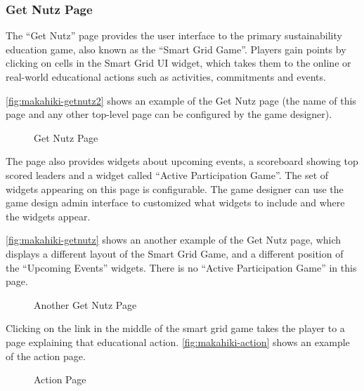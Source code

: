 \subsubsection{Get Nutz Page}
The ``Get Nutz'' page provides the user interface to the primary sustainability education game, also known as the ``Smart Grid Game''. Players gain points by clicking on cells in the Smart Grid UI widget, which takes them to the online or real-world educational actions such as activities, commitments and events.

\autoref{fig:makahiki-getnutz2} shows an example of the Get Nutz page (the name of this page and any other top-level page can be configured by the game designer).

\begin{figure}[!ht]
\begin{center}
\end{center}
\caption{Get Nutz Page}
\label{fig:makahiki-getnutz2}
\end{figure}

The page also provides widgets about upcoming events, a scoreboard showing top scored leaders and a widget called ``Active Participation Game''. The set of widgets appearing on this page is configurable. The game designer can use the game design admin interface to customized what widgets to include and where the widgets appear. 

\clearpage

\autoref{fig:makahiki-getnutz} shows an another example of the Get Nutz page, which displays a different layout of the Smart Grid Game, and a different position of the ``Upcoming Events'' widgets. There is no ``Active Participation Game'' in this page.

\begin{figure}[!ht]
\begin{center}
\end{center}
\caption{Another Get Nutz Page}
\label{fig:makahiki-getnutz}
\end{figure}

\clearpage

Clicking on the link in the middle of the smart grid game takes the player to a page explaining that educational action.  \autoref{fig:makahiki-action} shows an example of the action page. 

\begin{figure}[!ht]
\begin{center}
\end{center}
\caption{Action Page}
\label{fig:makahiki-action}
\end{figure}

